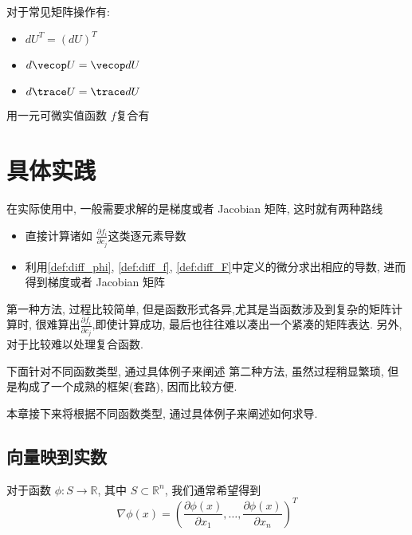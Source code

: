 \documentclass{ctexbook}
\begin{document}
对于常见矩阵操作有:
\begin{itemize}
  \item $dU^T = (dU)^T$
  \item $d \vecop U = \vecop dU$
  \item $d \trace U = \trace dU$
\end{itemize}

用一元可微实值函数 $f$复合有 

\chapter{具体实践}\label{chap:calcu}
在实际使用中, 一般需要求解的是梯度或者 Jacobian 矩阵, 这时就有两种路线
\begin{itemize}
  \item 直接计算诸如 $\frac{\partial f_i}{\partial c_j}$这类逐元素导数
  \item 利用\ref{def:diff_phi}, \ref{def:diff_f}, \ref{def:diff_F}中定义的微分求出相应的导数, 进而得到梯度或者 Jacobian 矩阵
\end{itemize}

第一种方法, 过程比较简单, 但是函数形式各异,尤其是当函数涉及到复杂的矩阵计算时, 很难算出$\frac{\partial f_i}{\partial c_j}$,即使计算成功, 最后也往往难以凑出一个紧凑的矩阵表达. 另外, 对于比较难以处理复合函数.

下面针对不同函数类型, 通过具体例子来阐述
第二种方法, 虽然过程稍显繁琐, 但是构成了一个成熟的框架(套路), 因而比较方便.

本章接下来将根据不同函数类型, 通过具体例子来阐述如何求导.

\section{向量映到实数}
对于函数 $\phi : S \rightarrow \mathbb R$, 其中 $S\subset \mathbb R^n $, 我们通常希望得到
\begin{equation*}
  \nabla \phi(x) = (\frac{\partial \phi(x)}{\partial x_1},\dots, \frac{\partial \phi(x)}{\partial x_n})^T
\end{equation*}
\end{document}
